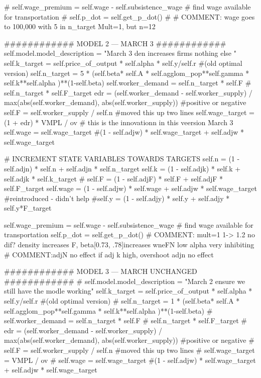         # self.wage_premium     = self.wage - self.subsistence_wage # find wage available for transportation
        # self.p_dot            = self.get_p_dot()
        # # COMMENT: wage goes to 100,000 with 5 in n_target  Mult=1, but n=12
      
     ############   MODEL 2  --- MARCH 3   ############ 
        self.model.model_description = "March 3 den increases firms nothing else "
        self.k_target = self.price_of_output * self.alpha * self.y/self.r     #(old optimal version)
        self.n_target   = 5 * (self.beta* self.A * self.agglom_pop**self.gamma *  self.k**self.alpha )**(1-self.beta) 
        self.worker_demand = self.n_target * self.F # self.n_target * self.F_target
        edr = (self.worker_demand - self.worker_supply) / max(abs(self.worker_demand), abs(self.worker_supply)) #positive or negative 
        self.F = self.worker_supply / self.n  #moved this up two lines
        self.wage_target = (1 + edr) * VMPL / ov  # this is the innovationn in this veersion March 3
        self.wage        = self.wage_target  #(1 - self.adjw) * self.wage_target + self.adjw * self.wage_target
        
        # INCREMENT STATE VARIABLES TOWARDS TARGETS 
        self.n        = (1 - self.adjn) * self.n + self.adjn * self.n_target
        self.k        = (1 - self.adjk) * self.k + self.adjk * self.k_target 
        # self.F        = (1 - self.adjF) * self.F + self.adjF * self.F_target
        self.wage     = (1 - self.adjw) * self.wage + self.adjw * self.wage_target  #reintroduced  - didn't help
        #self.y        = (1 - self.adjy) * self.y + self.adjy * self.y*F_target 

        self.wage_premium     = self.wage - self.subsistence_wage # find wage available for transportation
        self.p_dot            = self.get_p_dot()
        # COMMENT: mult=1 1-> 1.2 no dif? density increases F, beta[0.73, .78]increases wneFN low alpha very inhibiting
        # COMMENT:adjN no effect if adj k high, overshoot adjn no effect


     ############   MODEL 3  --- MARCH UNCHANGED    ############ 
        #  self.model.model_description = "March 2 ensure we still have the modle working"        self.k_target = self.price_of_output * self.alpha * self.y/self.r     #(old optimal version)
        # self.n_target   = 1 * (self.beta* self.A * self.agglom_pop**self.gamma *  self.k**self.alpha )**(1-self.beta) 
        # self.worker_demand = self.n_target * self.F # self.n_target * self.F_target
        # edr = (self.worker_demand - self.worker_supply) / max(abs(self.worker_demand), abs(self.worker_supply)) #positive or negative 
        # self.F = self.worker_supply / self.n  #moved this up two lines
        # self.wage_target =  VMPL / ov
        # self.wage        = self.wage_target  #(1 - self.adjw) * self.wage_target + self.adjw * self.wage_target
        
